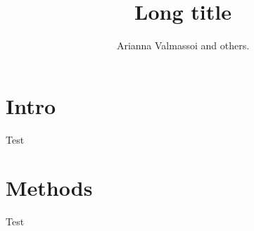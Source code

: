 \documentclass[compress,12pt,xcolor=dvipsnames]{beamer}
\title[Short title]{Long title}
\author[A.Valmassoi]{Arianna Valmassoi and others.}
\institute{Schools}
\begin{document}
\begin{frame}
\begin{flushleft}
\end{flushleft}
\vspace{-5mm}
\maketitle
\vspace{-22mm}
\begin{flushright}
\end{flushright}

\end{frame}


\begin{frame} 
 \tableofcontents
 \end{frame}
\section{Intro}
\begin{frame} 
 Test
 \end{frame}
\section{Methods}
\begin{frame} 
Test
\end{frame}
\end{document}
